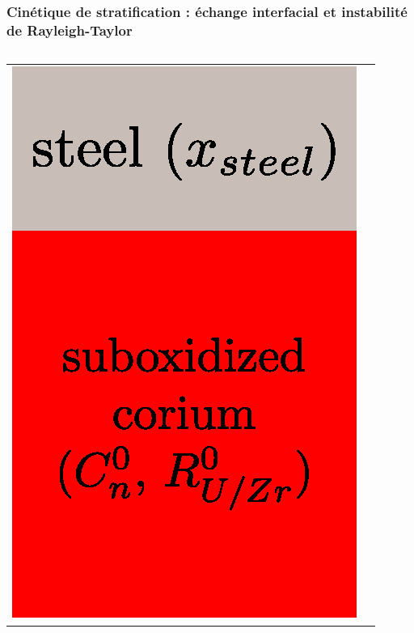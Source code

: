 \subsubsection{Cinétique de stratification : échange interfacial et instabilité de Rayleigh-Taylor}
\begin{frame}
	\baselineskip
	\begin{columns}[T]
	\begin{column}{0.5\textwidth}
	\begin{tabularx}{\textwidth}{CC}
	\includegraphics[height=0.25\textheight]{Figures/schema_stratif_2_ini.eps} &

\end{tabularx}
\end{column}
\end{columns}
\end{frame}
